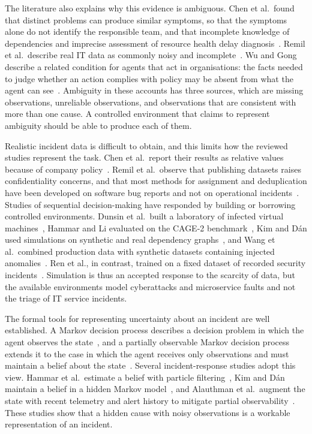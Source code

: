 \documentclass[12pt,a4paper]{article}
\begin{document}
The literature also explains why this evidence is ambiguous. Chen et al.\ found that distinct problems can produce similar symptoms, so that the symptoms alone do not identify the responsible team, and that incomplete knowledge of dependencies and imprecise assessment of resource health delay diagnosis~\cite{chen2020}. Remil et al.\ describe real IT data as commonly noisy and incomplete~\cite{remil2024}. Wu and Gong describe a related condition for agents that act in organisations: the facts needed to judge whether an action complies with policy may be absent from what the agent can see~\cite{wu2026}. Ambiguity in these accounts has three sources, which are missing observations, unreliable observations, and observations that are consistent with more than one cause. A controlled environment that claims to represent ambiguity should be able to produce each of them.

Realistic incident data is difficult to obtain, and this limits how the reviewed studies represent the task. Chen et al.\ report their results as relative values because of company policy~\cite{chen2020}. Remil et al.\ observe that publishing datasets raises confidentiality concerns, and that most methods for assignment and deduplication have been developed on software bug reports and not on operational incidents~\cite{remil2024}. Studies of sequential decision-making have responded by building or borrowing controlled environments. Dunsin et al.\ built a laboratory of infected virtual machines~\cite{dunsin2025}, Hammar and Li evaluated on the CAGE-2 benchmark~\cite{hammar2025}, Kim and D\'{a}n used simulations on synthetic and real dependency graphs~\cite{kim2025}, and Wang et al.\ combined production data with synthetic datasets containing injected anomalies~\cite{wang2023hrlhf}. Ren et al., in contrast, trained on a fixed dataset of recorded security incidents~\cite{ren2025}. Simulation is thus an accepted response to the scarcity of data, but the available environments model cyberattacks and microservice faults and not the triage of IT service incidents.

The formal tools for representing uncertainty about an incident are well established. A Markov decision process describes a decision problem in which the agent observes the state~\cite{sutton2018}, and a partially observable Markov decision process extends it to the case in which the agent receives only observations and must maintain a belief about the state~\cite{kaelbling1998}. Several incident-response studies adopt this view. Hammar et al.\ estimate a belief with particle filtering~\cite{hammar2026belief}, Kim and D\'{a}n maintain a belief in a hidden Markov model~\cite{kim2025}, and Alauthman et al.\ augment the state with recent telemetry and alert history to mitigate partial observability~\cite{alauthman2026}. These studies show that a hidden cause with noisy observations is a workable representation of an incident.
\end{document}
